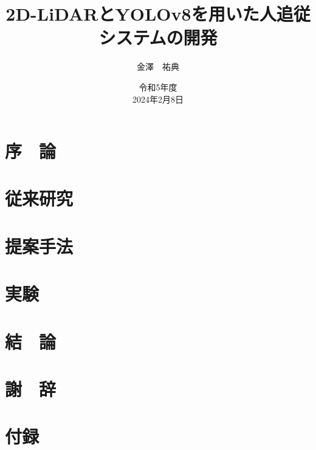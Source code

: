 \documentclass[12pt,a4paper]{jreport}
\title{2D-LiDARとYOLOv8を用いた人追従システムの開発}
\author{金澤　祐典}
\date{令和5年度\\2024年2月8日}
\begin{document}
\maketitle

\tableofcontents
\listoffigures
\listoftables
\newpage
{}
\setcounter{page}{1}

\chapter{序　論}

\chapter{従来研究}

\chapter{提案手法}

\chapter{実験}

\chapter{結　論}

\chapter*{謝　辞}



\chapter*{付録}

\end{document}
